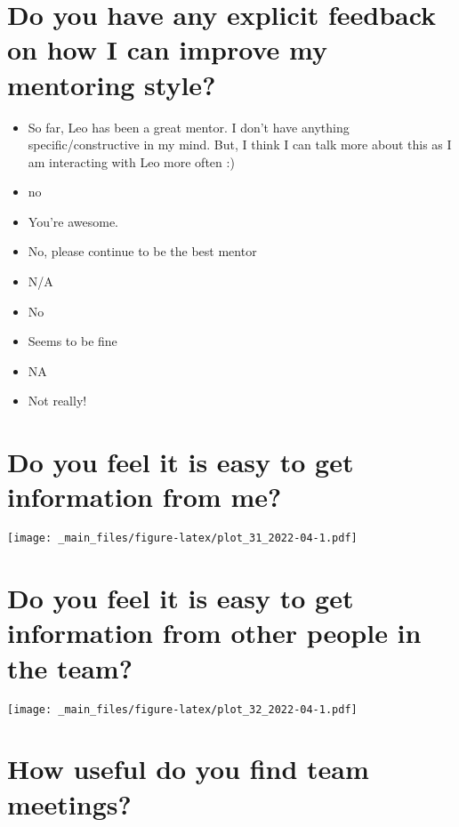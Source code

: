 \documentclass[
]{book}
\providecommand{\tightlist}{%
  \setlength{\itemsep}{0pt}\setlength{\parskip}{0pt}}
\begin{document}
\hypertarget{do-you-have-any-explicit-feedback-on-how-i-can-improve-my-mentoring-style}{%
\section{Do you have any explicit feedback on how I can improve my mentoring style?}\label{do-you-have-any-explicit-feedback-on-how-i-can-improve-my-mentoring-style}}

\begin{itemize}
\tightlist
\item
  So far, Leo has been a great mentor. I don't have anything specific/constructive in my mind. But, I think I can talk more about this as I am interacting with Leo more often :)
\item
  no
\item
  You're awesome.
\item
  No, please continue to be the best mentor
\item
  N/A
\item
  No
\item
  Seems to be fine
\item
  NA
\item
  Not really!
\end{itemize}

\hypertarget{do-you-feel-it-is-easy-to-get-information-from-me}{%
\section{Do you feel it is easy to get information from me?}\label{do-you-feel-it-is-easy-to-get-information-from-me}}

\texttt{[image: \_main\_files/figure-latex/plot\_31\_2022-04-1.pdf]}

\hypertarget{do-you-feel-it-is-easy-to-get-information-from-other-people-in-the-team}{%
\section{Do you feel it is easy to get information from other people in the team?}\label{do-you-feel-it-is-easy-to-get-information-from-other-people-in-the-team}}

\texttt{[image: \_main\_files/figure-latex/plot\_32\_2022-04-1.pdf]}

\hypertarget{how-useful-do-you-find-team-meetings}{%
\section{How useful do you find team meetings?}\label{how-useful-do-you-find-team-meetings}}
\end{document}
